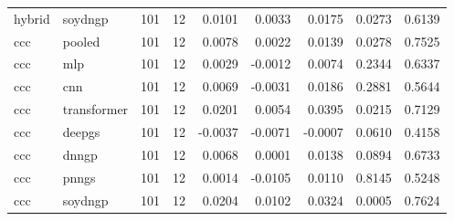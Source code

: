 \begin{longtable}{llrrrrrrr}
hybrid & soydngp & 101 & 12 & 0.0101 & 0.0033 & 0.0175 & 0.0273 & 0.6139 \\
ccc & pooled & 101 & 12 & 0.0078 & 0.0022 & 0.0139 & 0.0278 & 0.7525 \\
ccc & mlp & 101 & 12 & 0.0029 & -0.0012 & 0.0074 & 0.2344 & 0.6337 \\
ccc & cnn & 101 & 12 & 0.0069 & -0.0031 & 0.0186 & 0.2881 & 0.5644 \\
ccc & transformer & 101 & 12 & 0.0201 & 0.0054 & 0.0395 & 0.0215 & 0.7129 \\
ccc & deepgs & 101 & 12 & -0.0037 & -0.0071 & -0.0007 & 0.0610 & 0.4158 \\
ccc & dnngp & 101 & 12 & 0.0068 & 0.0001 & 0.0138 & 0.0894 & 0.6733 \\
ccc & pnngs & 101 & 12 & 0.0014 & -0.0105 & 0.0110 & 0.8145 & 0.5248 \\
ccc & soydngp & 101 & 12 & 0.0204 & 0.0102 & 0.0324 & 0.0005 & 0.7624 \\
\end{longtable}
